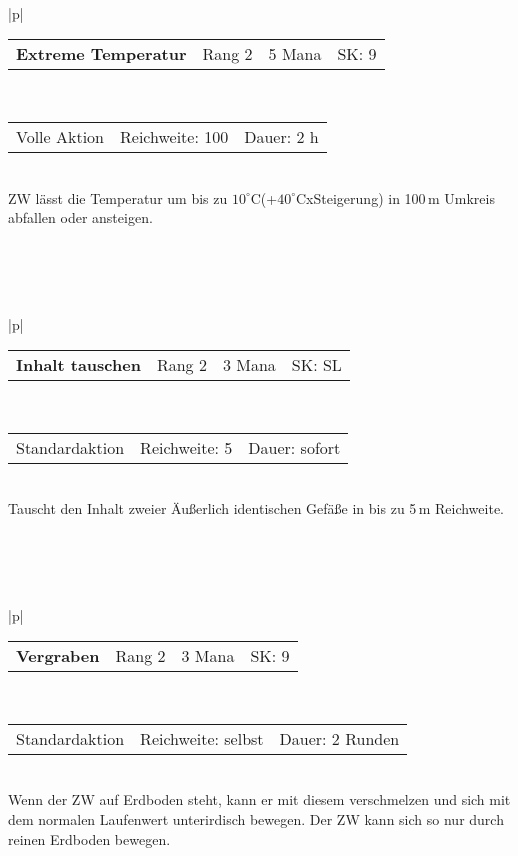 \documentclass[../../Heldenanleitung2]{subfiles}
\begin{document}
\\\\\\
\begin{tabular}{|p{\textwidth}|}
\hline
\begin{tabularx}{\textwidth}{X|X|X|X}
\textbf{Extreme Temperatur} & Rang 2 & 5 Mana & SK: 9
\end{tabularx} \\ \hline
\begin{tabularx}{\textwidth}{X|X|X}
Volle Aktion & Reichweite: 100 & Dauer: 2 h
\end{tabularx} \\ \hline
ZW lässt die Temperatur um bis zu $10^\circ$C(+$40^\circ$CxSteigerung) in 100\,m Umkreis abfallen oder ansteigen.
\\ \hline
\end{tabular}
\\\\\\
\begin{tabular}{|p{\textwidth}|}
\hline
\begin{tabularx}{\textwidth}{X|X|X|X}
\textbf{Inhalt tauschen} & Rang 2 & 3 Mana  & SK: SL
\end{tabularx} \\ \hline
\begin{tabularx}{\textwidth}{X|X|X}
Standardaktion & Reichweite: 5 & Dauer: sofort
\end{tabularx} \\ \hline
Tauscht den Inhalt zweier Äußerlich identischen Gefäße in bis zu 5\,m Reichweite. 
\\ \hline
\end{tabular}
\\\\\\
\begin{tabular}{|p{\textwidth}|}
\hline
\begin{tabularx}{\textwidth}{X|X|X|X}
\textbf{Vergraben} & Rang 2 & 3 Mana & SK: 9
\end{tabularx} \\ \hline
\begin{tabularx}{\textwidth}{X|X|X}
Standardaktion & Reichweite: selbst & Dauer: 2 Runden
\end{tabularx} \\ \hline
Wenn der ZW auf Erdboden steht, kann er mit diesem verschmelzen und sich mit dem normalen Laufenwert unterirdisch bewegen. Der ZW kann sich so nur durch reinen Erdboden bewegen.
\\ \hline
\end{tabular}
\end{document}
